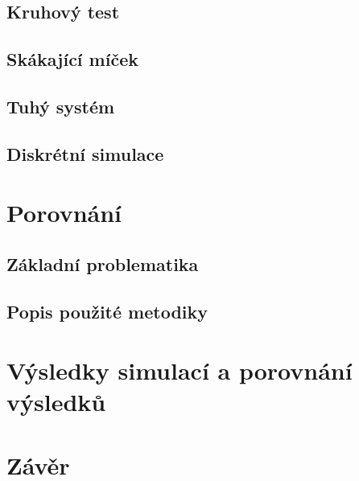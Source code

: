 \section{Kruhový test}

\section{Skákající míček}

\section{Tuhý systém}

\section{Diskrétní simulace}


\chapter{Porovnání}
\label{kapitola5}

\section{Základní problematika}

\section{Popis použité metodiky}


\chapter{Výsledky simulací a porovnání výsledků}
\label{kapitola6}

\chapter{Závěr}
\label{kapitola7}



